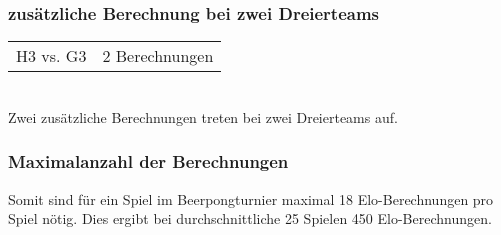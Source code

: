 \documentclass[a4paper, 12pt]{article}
\begin{document}
\subsubsection{zusätzliche Berechnung bei zwei Dreierteams}
\begin{tabular}[h]{ll}
H3 vs. G3 & 2 Berechnungen \\
\end{tabular}
\\Zwei zusätzliche Berechnungen treten bei zwei Dreierteams auf.
\subsubsection{Maximalanzahl der Berechnungen}
Somit sind für ein Spiel im Beerpongturnier maximal 18 Elo-Berechnungen pro Spiel nötig. Dies ergibt bei durchschnittliche 25 Spielen 450 Elo-Berechnungen.
\end{document}
